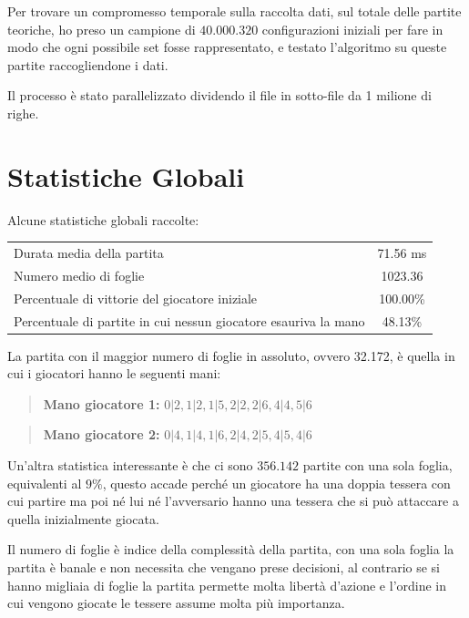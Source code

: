 \documentclass[a4paper,12pt]{report}
\begin{document}
Per trovare un compromesso temporale sulla raccolta dati, sul totale delle partite teoriche, ho preso un campione di \(40.000.320\) configurazioni iniziali per fare in modo che ogni possibile set fosse rappresentato, e testato l'algoritmo su queste partite raccogliendone i dati.

Il processo è stato parallelizzato dividendo il file in sotto-file da 1 milione di righe.



\section{Statistiche Globali}

Alcune statistiche globali raccolte:

\begin{table}[h!]
    \centering
    \begin{tabular}{|l|c|}
        \hline
        Durata media della partita & 71.56 ms \\
        Numero medio di foglie & 1023.36 \\
        Percentuale di vittorie del giocatore iniziale & 100.00\% \\
        Percentuale di partite in cui nessun giocatore esauriva la mano & 48.13\% \\
        \hline
    \end{tabular}
    \label{tab:global_stats}
\end{table}

La partita con il maggior numero di foglie in assoluto, ovvero 32.172, è quella in cui i giocatori hanno le seguenti mani:

\begin{quote}
    \textbf{Mano giocatore 1:} \(0|2, 1|2, 1|5, 2|2, 2|6, 4|4, 5|6\)
\end{quote}

\begin{quote}
    \textbf{Mano giocatore 2:} \(0|4, 1|4, 1|6, 2|4, 2|5, 4|5, 4|6\) 
\end{quote}



Un'altra statistica interessante è che ci sono \( 356.142 \) partite con una sola foglia, equivalenti al \( 9\%\), questo accade perché un giocatore ha una doppia tessera con cui partire ma poi né lui né l'avversario hanno una tessera che si può attaccare a quella inizialmente giocata.


Il numero di foglie è indice della complessità della partita, con una sola foglia la partita è banale e non necessita che vengano prese decisioni, al contrario se si hanno migliaia di foglie la partita permette molta libertà d'azione e l'ordine in cui vengono giocate le tessere assume molta più importanza.
\end{document}

